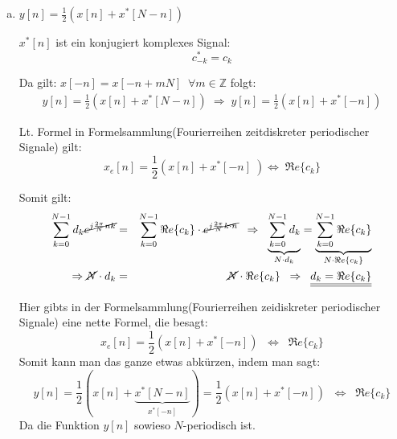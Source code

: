 \begin{uebsp}
\begin{Answer}
\begin{enumerate}[a)]
        \item $y[n]=\frac{1}{2}\left(x[n]+x^*\left[N-n\right]\right)$
            \begin{uebsp_theory}
                $x^*[n]$ ist ein konjugiert komplexes Signal:
                \[c_{-k}^*=c_k\]
            \end{uebsp_theory}
            Da gilt: $x[-n]=x[-n+mN]\;\;\forall m\in\mathbb{Z}$ folgt:
            \begin{eqnarray*}
                y[n]=\frac{1}{2}(x[n]+x^*[N-n])\;\Rightarrow\;y[n]=\frac{1}{2}(x[n]+x^*[-n])
            \end{eqnarray*}
            \begin{uebsp_theory}
                Lt. Formel in Formelsammlung(Fourierreihen zeitdiskreter periodischer Signale) gilt:
                \[x_e[n]=\frac{1}{2}\left(x[n]+x^*[-n]\;\right)\Leftrightarrow\;\Re e\{c_k\}\]
            \end{uebsp_theory}
            Somit gilt:
            \begin{eqnarray*}
                \sum_{k=0}^{N-1}d_k\cancel{e^{j\frac{2\pi}{N}nk}}&=&\sum_{k=0}^{N-1}\Re e\{c_k\}\cdot \cancel{e^{j\frac{2\pi}{N}k\cdot n}}\;\;\Rightarrow\;\;
                \underbrace{\sum_{k=0}^{N-1}d_{k}}_{N\cdot d_{k}}=\underbrace{\sum_{k=0}^{N-1}\Re e\{c_k\}}_{N\cdot \Re e\{c_k\}}\\
                \Rightarrow\cancel N\cdot d_k&=&\cancel N\cdot \Re e\{c_k\}\;\;\Rightarrow\;\;
                \underline{\underline{d_k=\Re e\{c_{k}\}}}
            \end{eqnarray*}
        \begin{hint}
            Hier gibts in der Formelsammlung(Fourierreihen zeidiskreter periodischer Signale) eine nette Formel, die besagt:
            \[x_e[n]=\frac{1}{2}(x[n]+x^*[-n])\;\;\Leftrightarrow\;\;\Re e\{c_k\}\]
            Somit kann man das ganze etwas abkürzen, indem man sagt:
            \[y[n]=\frac{1}{2}(x[n]+\underbrace{x^*[N-n]}_{x^*[-n]})=\frac{1}{2}(x[n]+{x^*[-n]})\;\;\Leftrightarrow\;\;\Re e\{c_k\}\]
            Da die Funktion $y[n]$ sowieso $N$-periodisch ist.
        \end{hint}


\end{enumerate}
\end{Answer}
\end{uebsp}

